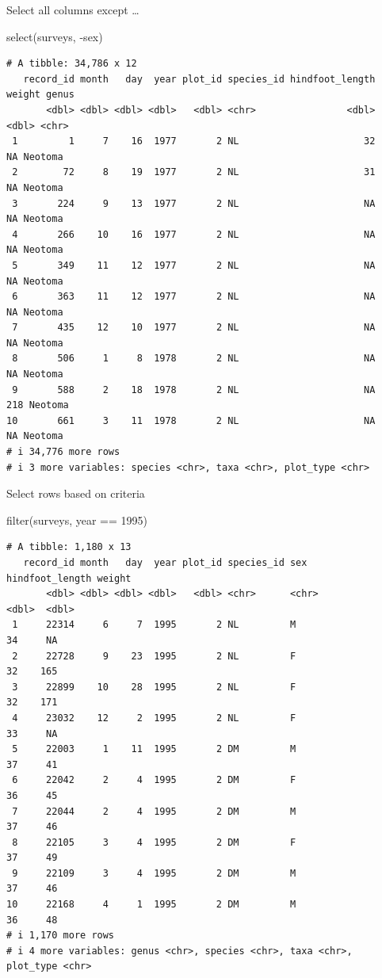 \documentclass[
  letterpaper,
  DIV=11,
  numbers=noendperiod]{scrreprt}
\newenvironment{Shaded}{\begin{snugshade}}{\end{snugshade}}
\newcommand{\DecValTok}[1]{\textcolor[rgb]{0.68,0.00,0.00}{#1}}
\newcommand{\FunctionTok}[1]{\textcolor[rgb]{0.28,0.35,0.67}{#1}}
\newcommand{\NormalTok}[1]{\textcolor[rgb]{0.00,0.23,0.31}{#1}}
\newcommand{\SpecialCharTok}[1]{\textcolor[rgb]{0.37,0.37,0.37}{#1}}
\begin{document}
Select all columns except \ldots{}

\begin{Shaded}
\begin{Highlighting}[]
\FunctionTok{select}\NormalTok{(surveys, }\SpecialCharTok{{-}}\NormalTok{sex)}
\end{Highlighting}
\end{Shaded}

\begin{verbatim}
# A tibble: 34,786 x 12
   record_id month   day  year plot_id species_id hindfoot_length weight genus  
       <dbl> <dbl> <dbl> <dbl>   <dbl> <chr>                <dbl>  <dbl> <chr>  
 1         1     7    16  1977       2 NL                      32     NA Neotoma
 2        72     8    19  1977       2 NL                      31     NA Neotoma
 3       224     9    13  1977       2 NL                      NA     NA Neotoma
 4       266    10    16  1977       2 NL                      NA     NA Neotoma
 5       349    11    12  1977       2 NL                      NA     NA Neotoma
 6       363    11    12  1977       2 NL                      NA     NA Neotoma
 7       435    12    10  1977       2 NL                      NA     NA Neotoma
 8       506     1     8  1978       2 NL                      NA     NA Neotoma
 9       588     2    18  1978       2 NL                      NA    218 Neotoma
10       661     3    11  1978       2 NL                      NA     NA Neotoma
# i 34,776 more rows
# i 3 more variables: species <chr>, taxa <chr>, plot_type <chr>
\end{verbatim}

Select rows based on criteria

\begin{Shaded}
\begin{Highlighting}[]
\FunctionTok{filter}\NormalTok{(surveys, year }\SpecialCharTok{==} \DecValTok{1995}\NormalTok{)}
\end{Highlighting}
\end{Shaded}

\begin{verbatim}
# A tibble: 1,180 x 13
   record_id month   day  year plot_id species_id sex   hindfoot_length weight
       <dbl> <dbl> <dbl> <dbl>   <dbl> <chr>      <chr>           <dbl>  <dbl>
 1     22314     6     7  1995       2 NL         M                  34     NA
 2     22728     9    23  1995       2 NL         F                  32    165
 3     22899    10    28  1995       2 NL         F                  32    171
 4     23032    12     2  1995       2 NL         F                  33     NA
 5     22003     1    11  1995       2 DM         M                  37     41
 6     22042     2     4  1995       2 DM         F                  36     45
 7     22044     2     4  1995       2 DM         M                  37     46
 8     22105     3     4  1995       2 DM         F                  37     49
 9     22109     3     4  1995       2 DM         M                  37     46
10     22168     4     1  1995       2 DM         M                  36     48
# i 1,170 more rows
# i 4 more variables: genus <chr>, species <chr>, taxa <chr>, plot_type <chr>
\end{verbatim}
\end{document}
